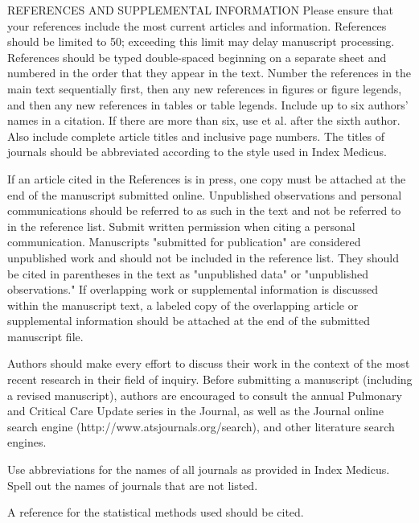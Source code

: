 REFERENCES AND SUPPLEMENTAL INFORMATION
Please ensure that your references include the most current articles and information. References should be limited to 50; exceeding this limit may delay manuscript processing. References should be typed double-spaced beginning on a separate sheet and numbered in the order that they appear in the text. Number the references in the main text sequentially first, then any new references in figures or figure legends, and then any new references in tables or table legends. Include up to six authors' names in a citation. If there are more than six, use et al. after the sixth author. Also include complete article titles and inclusive page numbers. The titles of journals should be abbreviated according to the style used in Index Medicus.

If an article cited in the References is in press, one copy must be attached at the end of the manuscript submitted online. Unpublished observations and personal communications should be referred to as such in the text and not be referred to in the reference list. Submit written permission when citing a personal communication. Manuscripts "submitted for publication" are considered unpublished work and should not be included in the reference list. They should be cited in parentheses in the text as "unpublished data" or "unpublished observations." If overlapping work or supplemental information is discussed within the manuscript text, a labeled copy of the overlapping article or supplemental information should be attached at the end of the submitted manuscript file.

Authors should make every effort to discuss their work in the context of the most recent research in their field of inquiry. Before submitting a manuscript (including a revised manuscript), authors are encouraged to consult the annual Pulmonary and Critical Care Update series in the Journal, as well as the Journal online search engine (http://www.atsjournals.org/search), and other literature search engines.

Use abbreviations for the names of all journals as provided in Index Medicus. Spell out the names of journals that are not listed.

A reference for the statistical methods used should be cited.

